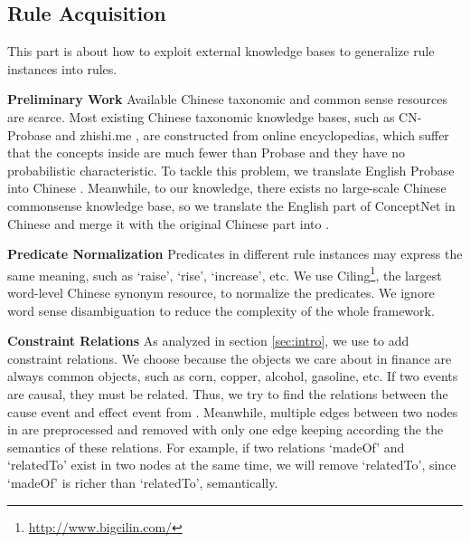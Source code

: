 \subsection{Rule Acquisition}
This part is about how to exploit external knowledge bases to generalize rule instances into rules.

\textbf{Preliminary Work}
Available Chinese taxonomic and common sense resources are scarce. 
Most existing Chinese taxonomic knowledge bases, such as CN-Probase \cite{Xu2017} and zhishi.me \cite{Niu2011}, are constructed from online encyclopedias, which suffer that the concepts inside are much fewer than Probase \cite{Wu2012a} and they have no probabilistic characteristic. 
To tackle this problem, we translate English Probase into Chinese \zhpro. 
Meanwhile, to our knowledge, there exists no large-scale Chinese commonsense knowledge base, so we translate the English part of ConceptNet in Chinese and merge it with the original Chinese part into \zhcon.

\textbf{Predicate Normalization}
Predicates in different rule instances may express the same meaning, such as `raise', `rise', `increase', etc. We use Ciling\footnote{ \url{ http://www.bigcilin.com/}}, the largest word-level Chinese synonym resource, to normalize the predicates. We ignore word sense disambiguation to reduce the complexity of the whole framework.


\textbf{Constraint Relations}
As analyzed in section \ref{sec:intro}, we use \zhcon to add constraint relations. 
We choose \zhcon because the objects we care about in finance are always common objects, such as corn, copper, alcohol, gasoline, etc. 
If two events are causal, they must be related. 
Thus, we try to find the relations between the cause event and effect event from \zhcon.
Meanwhile, multiple edges between two nodes in \zhcon are preprocessed and removed with only one edge keeping according the the semantics of these relations. For example, if two relations `madeOf' and `relatedTo' exist in two nodes at the same time, we will remove `relatedTo', since `madeOf' is richer than `relatedTo', semantically. 
	
